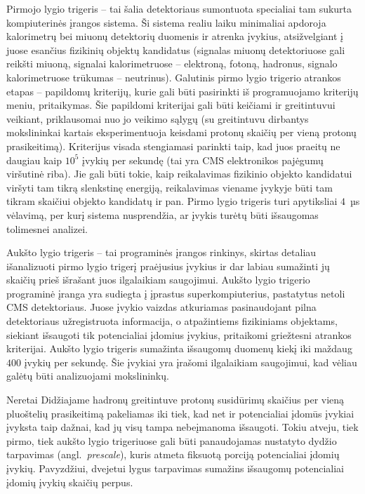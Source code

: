 \documentclass[a4paper, 12pt, oneside]{article}
\begin{document}
Pirmojo lygio trigeris -- tai šalia detektoriaus sumontuota specialiai tam sukurta kompiuterinės įrangos sistema.
Ši sistema realiu laiku minimaliai apdoroja kalorimetrų bei miuonų detektorių duomenis ir atrenka įvykius, atsižvelgiant
į juose esančius fizikinių objektų kandidatus (signalas miuonų detektoriuose gali reikšti miuoną, signalai kalorimetruose --
elektroną, fotoną, hadronus, signalo kalorimetruose trūkumas -- neutrinus).
Galutinis pirmo lygio trigerio atrankos etapas -- papildomų kriterijų, kurie gali būti pasirinkti iš programuojamo
kriterijų meniu, pritaikymas.
Šie papildomi kriterijai gali būti keičiami ir greitintuvui veikiant, priklausomai nuo jo veikimo sąlygų
(su greitintuvu dirbantys mokslininkai kartais eksperimentuoja keisdami protonų skaičių per vieną protonų prasikeitimą).
Kriterijus visada stengiamasi parinkti taip, kad juos praeitų ne daugiau kaip $10^5$ įvykių per sekundę
(tai yra CMS elektronikos pajėgumų viršutinė riba).
Jie gali būti tokie, kaip reikalavimas fizikinio objekto kandidatui viršyti tam tikrą slenkstinę energiją, reikalavimas
viename įvykyje būti tam tikram skaičiui objekto kandidatų ir pan.
Pirmo lygio trigeris turi apytiksliai $4$~µs vėlavimą, per kurį sistema nusprendžia, ar įvykis turėtų būti
išsaugomas tolimesnei analizei. 

Aukšto lygio trigeris -- tai programinės įrangos rinkinys, skirtas detaliau išanalizuoti pirmo lygio trigerį praėjusius
įvykius ir dar labiau sumažinti jų skaičių prieš išrašant juos ilgalaikiam saugojimui.
Aukšto lygio trigerio programinė įranga yra sudiegta į įprastus superkompiuterius, pastatytus netoli CMS detektoriaus.
Juose įvykio vaizdas atkuriamas pasinaudojant pilna detektoriaus užregistruota informacija, o atpažintiems fizikiniams
objektams, siekiant išsaugoti tik potencialiai įdomius įvykius, pritaikomi griežtesni atrankos kriterijai.
Aukšto lygio trigeris sumažinta išsaugomų duomenų kiekį iki maždaug $400$ įvykių per sekundę.
Šie įvykiai yra įrašomi ilgalaikiam saugojimui, kad vėliau galėtų būti analizuojami mokslininkų.

Neretai Didžiajame hadronų greitintuve protonų susidūrimų skaičius per vieną pluoštelių prasikeitimą pakeliamas iki tiek,
kad net ir potencialiai įdomūs įvykiai įvyksta taip dažnai, kad jų visų tampa nebeįmanoma išsaugoti.
Tokiu atveju, tiek pirmo, tiek aukšto lygio trigeriuose gali būti panaudojamas nustatyto dydžio tarpavimas (angl.\ \textit{prescale}),
kuris atmeta fiksuotą porciją potencialiai įdomių įvykių.
Pavyzdžiui, dvejetui lygus tarpavimas sumažins išsaugomų potencialiai įdomių įvykių skaičių perpus.
\end{document}
